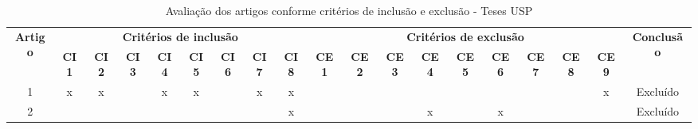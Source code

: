 \documentclass[
	12pt,				%
	oneside,			%
	a4paper,			%
	english,			%
	brazil				%
	]{abntex2ppgsi}
\begin{document}
\begin{apendicesenv}
\begin{table}[H]
\centering
\caption{Avaliação dos artigos conforme critérios de inclusão e exclusão - Teses USP}
\label{tab:crit_IncExc_TU}
\setlength{\tabcolsep}{1.5pt} %
\footnotesize %
\begin{tabular}{c | c c c c c c c c | c c c c c c c c c | c}
\toprule
    \multirow{2}{*}{\textbf{Artigo}} & 
    \multicolumn{8}{c|}{\textbf{Critérios de inclusão}} &
    \multicolumn{9}{c|}{\textbf{Critérios de exclusão}} &
    \multirow{2}{*}{\textbf{Conclusão}} \\ 
    \cline{2-18}
 & \tiny\textbf{CI1} & \tiny\textbf{CI2} & \tiny\textbf{CI3} & \tiny\textbf{CI4} & \tiny\textbf{CI5} & \tiny\textbf{CI6} & \tiny\textbf{CI7} & \tiny\textbf{CI8} & \tiny\textbf{CE1} & \tiny\textbf{CE2} & \tiny\textbf{CE3} & \tiny\textbf{CE4} & \tiny\textbf{CE5} & \tiny\textbf{CE6} & \tiny\textbf{CE7} & \tiny\textbf{CE8} & \tiny\textbf{CE9} & \\
\midrule
 1 & x & x &   & x & x &   & x & x &   &   &   &   &   &   &   &   & x & Excluído \\
 2 &   &   &   &   &   &   &   & x &   &   &   & x &   & x &   &   &   & Excluído \\
\bottomrule
\end{tabular}
\end{table}




\end{apendicesenv}
\end{document}
